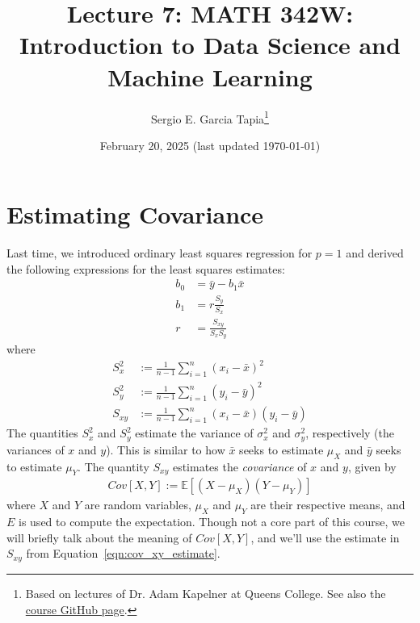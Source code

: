 \documentclass[12pt, a4paper]{article}
\title{Lecture 7: MATH 342W: Introduction to Data Science and Machine Learning}
\author{Sergio E. Garcia Tapia\thanks{Based on lectures of Dr. Adam Kapelner at Queens College.
See also the \href{https://github.com/kapelner/QC_MATH_342W_Spring_2025}{course GitHub page}.}}
\date{February 20, 2025 (last updated \today)}
\theoremstyle{definition}
\begin{document}
	\maketitle
	\section*{Estimating Covariance}
	Last time, we introduced ordinary least squares regression for $p=1$ and derived the following
	expressions for the least squares estimates:
	\begin{align}
		b_0 &= \bar{y} - b_1 \bar{x}\label{eqn:ols_b0}\\
		b_1 &= r\frac{S_y}{S_x}\label{eqn:ols_b1_r}\\
		r &= \frac{S_{xy}}{S_xS_y}\nonumber
	\end{align}
	where
	\begin{align}
		S_x^2  &:= \frac{1}{n-1}\sum_{i=1}^{n}(x_i-\bar{x})^2\nonumber\\
		S_y^2  &:= \frac{1}{n-1}\sum_{i=1}^{n}(y_i-\bar{y})^2\nonumber\\
		S_{xy} &:= \frac{1}{n-1}\sum_{i=1}^{n}(x_i-\bar{x})(y_i-\bar{y})\label{eqn:cov_xy_estimate}
	\end{align}
	The quantities $S_x^2$ and $S_y^2$ estimate the variance of $\sigma_x^2$ and $\sigma_y^2$,
	respectively (the variances of $x$ and $y$). This is similar to how $\bar{x}$ seeks
	to estimate $\mu_X$ and $\bar{y}$ seeks to estimate $\mu_Y$. The quantity $S_{xy}$
	estimates the \emph{covariance} of $x$ and $y$, given by
	\begin{align*}
		Cov[X, Y] := \mathbb{E}[(X-\mu_X)(Y-\mu_Y)]
	\end{align*}
	where $X$ and $Y$ are random variables, $\mu_X$ and $\mu_Y$ are their respective means,
	and $E$ is used to compute the expectation. Though not a core part of this course, we
	will briefly talk about the meaning of $Cov[X, Y]$, and we'll use the estimate
	in $S_{xy}$ from Equation~\ref{eqn:cov_xy_estimate}.
\end{document}

